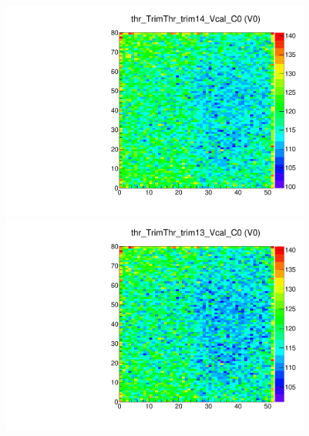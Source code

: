 \begin{figure}[!Hp]
\centering
\begin{minipage}{0.45\textwidth}
  \includegraphics[width=1.0\textwidth]{figures/trim_thr_TrimThr_trim14_Vcal.pdf}
  \caption{}
  \label{fig:trim_thr_TrimThr_trim14_Vcal}
\end{minipage}
\hspace{0.3cm}
\begin{minipage}{0.45\textwidth}
  \includegraphics[width=1.0\textwidth]{figures/trim_thr_TrimThr_trim13_Vcal.pdf}
  \caption{}
  \label{fig:trim_thr_TrimThr_trim13_Vcal}
\end{minipage}
\end{figure}

